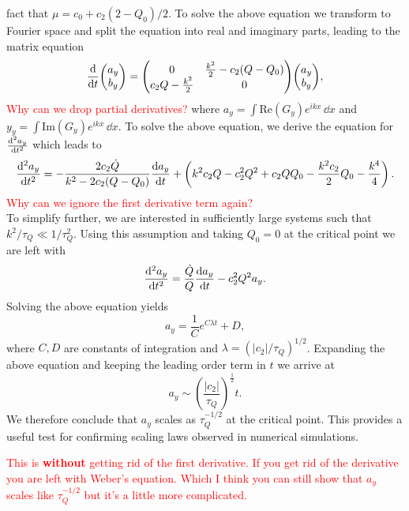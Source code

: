 fact that $\mu = c_0 + c_2(2-Q_0)/2$.
To solve the above equation we transform to Fourier space and split the equation
into real and imaginary parts, leading to the matrix equation
\begin{equation}
    \dv{t} \mqty(a_y \\ b_y) = \mqty(0 & \frac{k^2}{2}-c_2(Q-Q_0) \\
                                     c_2Q - \frac{k^2}{2} & 0)
                                \mqty(a_y \\ b_y),
\end{equation}
\textcolor{red}{Why can we drop partial derivatives?}
where $a_y = \int \mathrm{Re}(G_y)e^{ikx} \, \dd x$ and
$y_y = \int \mathrm{Im}(G_y)e^{ikx} \, \dd x$.
To solve the above equation, we derive the equation for $\dv[2]{a_y}{t}$
which leads to
\begin{equation}
    \dv[2]{a_y}{t} = -\frac{2c_2\dot{Q}}{k^2 - 2c_2(Q-Q_0)}\dv{a_y}{t} 
    + \left(k^2c_2Q - c_2^2Q^2 + c_2QQ_0 - \frac{k^2c_2}{2}Q_0 
    - \frac{k^4}{4}\right).
\end{equation}
\textcolor{red}{Why can we ignore the first derivative term again?}\\
To simplify further, we are interested in sufficiently large systems such that
$k^2/\tau_Q \ll 1 / \tau_Q^2$.
Using this assumption and taking $Q_0=0$ at the critical point we are left with
\begin{equation}
    \dv[2]{a_y}{t} = \frac{\dot{Q}}{Q}\dv{a_y}{t} - c_2^2Q^2a_y.
\end{equation}
Solving the above equation yields
\begin{equation}
    a_y = \frac{1}{C}e^{C\lambda t} + D,
\end{equation}
where $C, D$ are constants of integration and $\lambda =(|c_2|/\tau_Q)^{1/2}$.
Expanding the above equation and keeping the leading order term in $t$ we
arrive at
\begin{equation}
    a_y \sim \left(\frac{|c_2|}{\tau_Q}\right)^{\frac{1}{2}}t.
\end{equation}
We therefore conclude that $a_y$ scales as $\tau_Q^{-1/2}$ at the critical
point.
This provides a useful test for confirming scaling laws observed in numerical
simulations.

\textcolor{red}{This is {\bf without} getting rid of the first derivative.
If you get rid of the derivative you are left with Weber's equation. Which
I think you can still show that $a_y$ scales like $\tau_Q^{-1/2}$ but it's a
little more complicated.}

